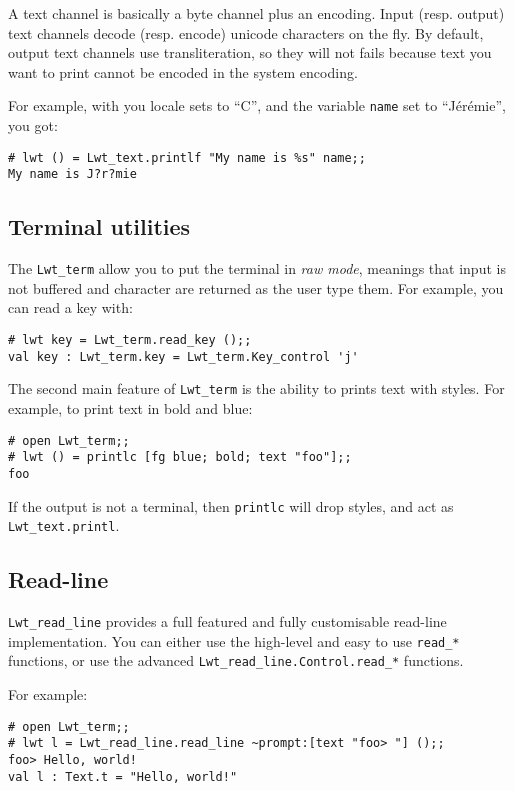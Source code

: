 \documentclass{article}
\begin{document}
A text channel is basically a byte channel plus an encoding. Input
(resp. output) text channels decode (resp. encode) unicode characters
on the fly. By default, output text channels use transliteration, so
they will not fails because text you want to print cannot be encoded
in the system encoding.

For example, with you locale sets to ``C'', and the variable
\texttt{name} set to ``Jérémie'', you got:

\begin{verbatim}
# lwt () = Lwt_text.printlf "My name is %s" name;;
My name is J?r?mie
\end{verbatim}

\subsection{Terminal utilities}

The \texttt{Lwt\_term} allow you to put the terminal in \emph{raw
  mode}, meanings that input is not buffered and character are
returned as the user type them. For example, you can read a key with:

\begin{verbatim}
# lwt key = Lwt_term.read_key ();;
val key : Lwt_term.key = Lwt_term.Key_control 'j'
\end{verbatim}

The second main feature of \texttt{Lwt\_term} is the ability to prints
text with styles. For example, to print text in bold and blue:

\begin{verbatim}
# open Lwt_term;;
# lwt () = printlc [fg blue; bold; text "foo"];;
foo
\end{verbatim}

If the output is not a terminal, then \texttt{printlc} will drop
styles, and act as \texttt{Lwt\_text.printl}.

\subsection{Read-line}

\texttt{Lwt\_read\_line} provides a full featured and fully
customisable read-line implementation. You can either use the
high-level and easy to use \texttt{read\_*} functions, or use the
advanced \texttt{Lwt\_read\_line.Control.read\_*} functions.

For example:

\begin{verbatim}
# open Lwt_term;;
# lwt l = Lwt_read_line.read_line ~prompt:[text "foo> "] ();;
foo> Hello, world!
val l : Text.t = "Hello, world!"
\end{verbatim}
\end{document}
